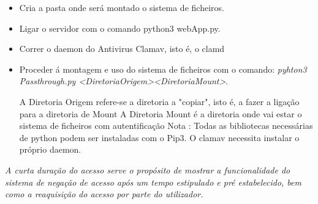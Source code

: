 \begin{itemize}
\item Cria a pasta onde será montado o sistema de ficheiros.\newline
\item Ligar o servidor com o comando python3 webApp.py.\newline
\item Correr o daemon do Antivirus Clamav, isto é, o clamd
\item Proceder á montagem e uso do sistema de ficheiros com o comando: \textit{pyhton3 Passthrough.py \textless DiretoriaOrigem\textgreater \textless DiretoriaMount\textgreater}.\newline


A Diretoria Origem refere-se a diretoria a "copiar", isto é, a fazer a ligação para a diretoria de Mount
A Diretoria Mount é a diretoria onde vai estar o sistema de ficheiros com autentificação\newline
Nota : Todas as bibliotecas necessárias de python podem ser instaladas com o Pip3. O clamav necessita instalar o próprio daemon.
\end{itemize}

\textit{ A curta duração do acesso serve o propósito de mostrar a funcionalidade do sistema de negação de acesso após um tempo estipulado e pré estabelecido, bem como a reaquisição do acesso por parte do utilizador.} 








